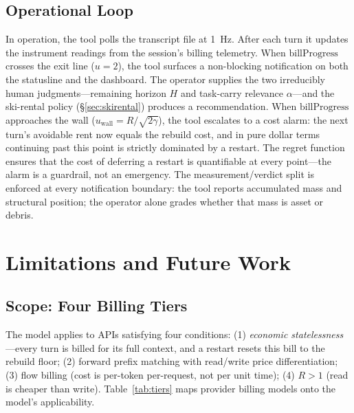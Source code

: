 \documentclass[11pt]{article}
\theoremstyle{definition}
\theoremstyle{remark}
\begin{document}
\subsection{Operational Loop}

In operation, the tool polls the transcript file at 1~Hz. After each turn it updates the instrument readings from the session's billing telemetry. When $\text{billProgress}$ crosses the exit line ($u = 2$), the tool surfaces a non-blocking notification on both the statusline and the dashboard. The operator supplies the two irreducibly human judgments---remaining horizon $H$ and task-carry relevance $\alpha$---and the ski-rental policy (\S\ref{sec:skirental}) produces a recommendation. When $\text{billProgress}$ approaches the wall ($u_{\text{wall}} = R/\sqrt{2\gamma}$), the tool escalates to a cost alarm: the next turn's avoidable rent now equals the rebuild cost, and in pure dollar terms continuing past this point is strictly dominated by a restart. The regret function ensures that the cost of deferring a restart is quantifiable at every point---the alarm is a guardrail, not an emergency. The measurement/verdict split is enforced at every notification boundary: the tool reports accumulated mass and structural position; the operator alone grades whether that mass is asset or debris.

\section{Limitations and Future Work}
\label{sec:limitations}

\subsection{Scope: Four Billing Tiers}

The model applies to APIs satisfying four conditions: (1) \emph{economic statelessness}---every turn is billed for its full context, and a restart resets this bill to the rebuild floor; (2) forward prefix matching with read/write price differentiation; (3) flow billing (cost is per-token per-request, not per unit time); (4) $R > 1$ (read is cheaper than write). Table~\ref{tab:tiers} maps provider billing models onto the model's applicability.
\end{document}

